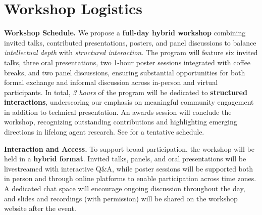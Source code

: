 
\vspace{-1.5mm}
\section{Workshop Logistics}
\vspace{-2mm}

\noindent\textbf{Workshop Schedule.}
We propose a \textbf{full-day hybrid workshop} combining invited talks, contributed presentations, posters, and panel discussions to balance \textit{intellectual depth} with \textit{structured interaction}. The program will feature six invited talks, three oral presentations, two 1-hour poster sessions integrated with coffee breaks, and two panel discussions, ensuring substantial opportunities for both formal exchange and informal discussion across in-person and virtual participants. In total, \textit{3 hours} of the program will be dedicated to \textbf{structured interactions}, underscoring our emphasis on meaningful community engagement in addition to technical presentation. An awards session will conclude the workshop, recognizing outstanding contributions and highlighting emerging directions in lifelong agent research. See  for a tentative schedule.

\noindent\textbf{Interaction and Access.}  
To support broad participation, the workshop will be held in a \textbf{hybrid format}. Invited talks, panels, and oral presentations will be livestreamed with interactive Q\&A, while poster sessions will be supported both in person and through online platforms to enable participation across time zones. A dedicated chat space will encourage ongoing discussion throughout the day, and slides and recordings (with permission) will be shared on the workshop website after the event.

